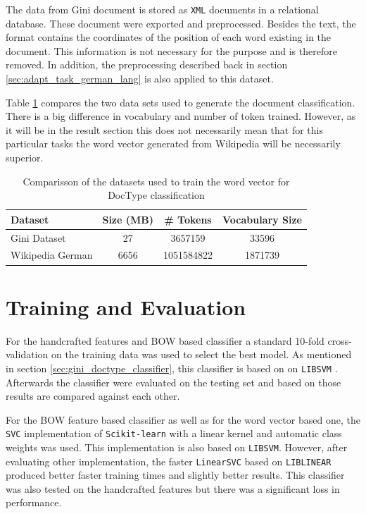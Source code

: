 The data from Gini document is stored as \texttt{XML} documents in a
relational database. These document were exported and preprocessed. Besides
the text, the format contains the coordinates of the position of each word
existing in the document. This information is not necessary for the purpose
and is therefore removed. In addition, the preprocessing described back in
section \ref{sec:adapt_task_german_lang} is also applied to this dataset.

Table \ref{tab:w2v4tc_dataset_comparisson} compares the two data sets used
to generate the document classification. There is a big difference in
vocabulary and number of token trained. However, as it will be in the result
section this does not necessarily mean that for this particular tasks the
word vector generated from Wikipedia will be necessarily superior.

\begin{table}[h]

  \centering
  \caption{Comparisson of the datasets used to train the word vector for
    \ac{DocType} classification}
  \label{tab:w2v4tc_dataset_comparisson}

\small
\begin{tabular}{|l|c|c|c|}
\hline
Dataset           &  Size (MB)  &    \# Tokens  &  Vocabulary  Size  \\
\hline
 Gini Dataset      &         27  &     3657159  &             33596  \\
 Wikipedia German  &       6656  &  1051584822  &           1871739  \\
\hline
\end{tabular}

\end{table}


\section{Training and Evaluation}

For the handcrafted features and \ac{BOW} based classifier a standard 10-fold
cross-validation  on the training data  was used to select the best model.
As mentioned in section \ref{sec:gini_doctype_classifier}, this classifier is
based on  on \texttt{LIBSVM} \cite{CC01a}.
Afterwards the classifier were evaluated on the testing set and based on
those results are compared against each other.

For the \ac{BOW} feature based classifier as well as for the word vector
based one, the  \texttt{SVC} implementation of  \texttt{Scikit-learn}
with a linear kernel and automatic class weights was used. This
implementation is also  based on \texttt{LIBSVM}. However, after evaluating
other implementation, the  faster \texttt{LinearSVC} based on \texttt{LIBLINEAR}
\cite{Fan:2008:LLL:1390681.1442794}  produced better faster training times
and slightly better results. This classifier was also tested on the
handcrafted features but there was a significant loss in performance.


